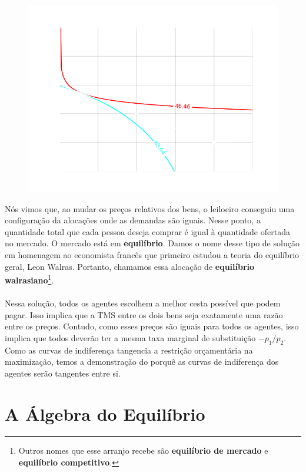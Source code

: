 \documentclass[a4paper,11pt,oneside]{book}
\theoremstyle{definition}
\theoremstyle{break}
\begin{document}
\begin{figure}[H]
\centering
\includegraphics[scale=0.45]{cap32_4-caixa_edgeworth_6.png}
\end{figure}

\newpage

Nós vimos que, ao mudar os preços relativos dos bens, o leiloeiro conseguiu uma configuração da alocações onde as demandas são iguais. Nesse ponto, a quantidade total que cada pessoa deseja comprar é igual à quantidade ofertada no mercado. O mercado está em \textbf{equilíbrio}. Damos o nome desse tipo de solução em homenagem ao economista francês que primeiro estudou a teoria do equilíbrio geral, Leon Walras. Portanto, chamamos essa alocação de \textbf{equilíbrio walrasiano}\footnote{Outros nomes que esse arranjo recebe são \textbf{equilíbrio de mercado} e \textbf{equilíbrio competitivo}.}.
\\
\\
Nessa solução, todos os agentes escolhem a melhor cesta possível que podem pagar. Isso implica que a TMS entre os dois bens seja exatamente uma razão entre os preços. Contudo, como esses preços são iguais para todos os agentes, isso implica que todos deverão ter a mesma taxa marginal de substituição $-p_1/p_2$. Como as curvas de indiferença tangencia a restrição orçamentária na maximização, temos a demonstração do porquê as curvas de indiferença dos agentes serão tangentes entre si. 

\section{A Álgebra do Equilíbrio}
\end{document}
